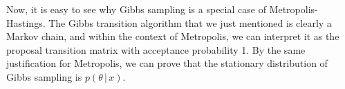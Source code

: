 \documentclass{article}
\begin{document}
  Now, it is easy to see why Gibbs sampling is a special case of Metropolis-Hastings. The Gibbs transition algorithm that we just mentioned is clearly a Markov chain, and within the context of Metropolis, we can interpret it as the proposal transition matrix with acceptance probability 1. By the same justification for Metropolis, we can prove that the stationary distribution of Gibbs sampling is $p(\theta\,|\,x)$.



\end{document}
